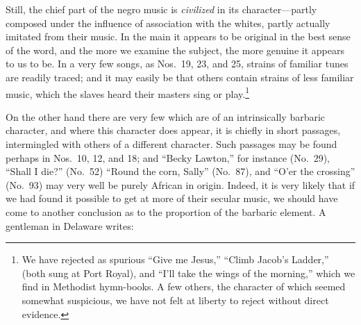 \documentclass[a5paper,10pt]{book}
\begin{document}
Still, the chief part of the negro music is \emph{civilized} in its
character---partly composed under the influence of association with
the whites, partly actually imitated from their music.  In the main it
appears to be original in the best sense of the word, and the more we
examine the subject, the more genuine it appears to us to be.  In a
very few songs, as Nos.~19, 23, and 25, strains of familiar tunes are
readily traced; and it may easily be that others contain strains of
less familiar music, which the slaves heard their masters sing or
play.\footnote{We have rejected as spurious ``Give me Jesus,'' ``Climb
Jacob's Ladder,'' (both sung at Port Royal), and ``I'll take the wings
of the morning,'' which we find in Methodist hymn-books.  A few
others, the character of which seemed somewhat suspicious, we have not
felt at liberty to reject without direct evidence.}

On the other hand there are very few which are of an intrinsically
barbaric character, and where this character does appear, it is
chiefly in short passages, intermingled with others of a different
character.  Such passages may be found perhaps in Nos.~10, 12, and 18;
and ``Becky Lawton,'' for instance (No.~29), ``Shall I die?'' (No.~52)
``Round the corn, Sally'' (No.~87), and ``O'er the crossing'' (No.~93)
may very well be purely African in origin.  Indeed, it is very likely
that if we had found it possible to get at more of their secular
music, we should have come to another conclusion as to the proportion
of the barbaric element.  A gentleman in Delaware writes:
\end{document}
